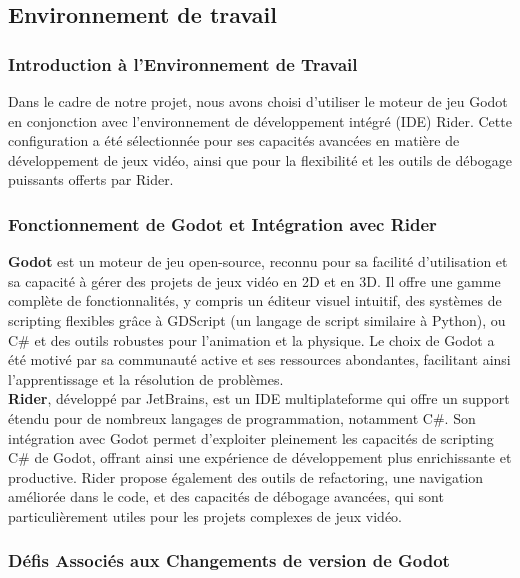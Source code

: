 


\subsection{Environnement de travail}


\subsubsection{Introduction à l'Environnement de Travail}
Dans le cadre de notre projet, nous avons choisi d'utiliser le moteur de jeu Godot en conjonction avec l'environnement de développement intégré (IDE) Rider.
Cette configuration a été sélectionnée pour ses capacités avancées en matière de développement de jeux vidéo, ainsi que pour la flexibilité et les outils de débogage puissants offerts par Rider.

\subsubsection{Fonctionnement de Godot et Intégration avec Rider}


\textbf{Godot} est un moteur de jeu open-source, reconnu pour sa facilité d'utilisation et sa capacité à gérer des projets de jeux vidéo en 2D et en 3D.
Il offre une gamme complète de fonctionnalités, y compris un éditeur visuel intuitif, des systèmes de scripting flexibles grâce à GDScript (un langage de script similaire à Python), ou C\# et des outils robustes pour l'animation et la physique.
Le choix de Godot a été motivé par sa communauté active et ses ressources abondantes, facilitant ainsi l'apprentissage et la résolution de problèmes.
\\

\textbf{Rider}, développé par JetBrains, est un IDE multiplateforme qui offre un support étendu pour de nombreux langages de programmation, notamment C\#.
Son intégration avec Godot permet d'exploiter pleinement les capacités de scripting C\# de Godot, offrant ainsi une expérience de développement plus enrichissante et productive.
Rider propose également des outils de refactoring, une navigation améliorée dans le code, et des capacités de débogage avancées, qui sont particulièrement utiles pour les projets complexes de jeux vidéo.

\subsubsection{Défis Associés aux Changements de version de Godot}

